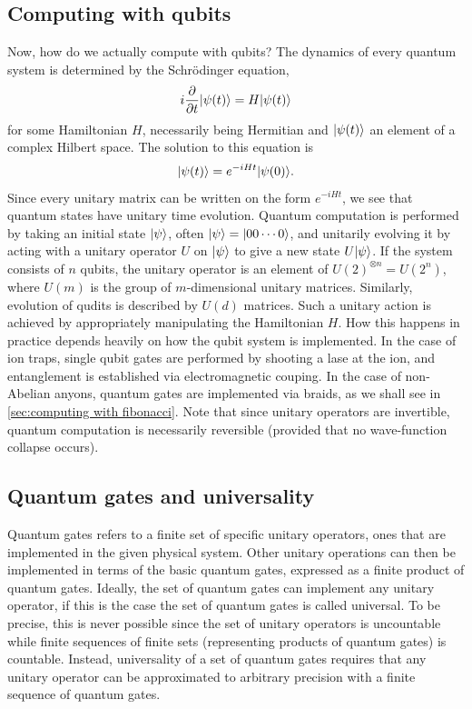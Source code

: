 \documentclass[a4paper,10pt,oneside]{book}
\theoremstyle{plain}
\theoremstyle{definition}
\theoremstyle{remark}
\DeclarePairedDelimiter\ket{\lvert}{\rangle}
\begin{document}
\subsection{Computing with qubits} Now, how do we actually compute with qubits? The dynamics of every quantum system is determined by the Schrödinger equation,
\begin{equation}
  i\frac{\partial}{\partial t}\ket{\psi(t)} = H\ket{\psi(t)}
\end{equation}
for some Hamiltonian $H$, necessarily being Hermitian and $\ket{\psi(t)}$ an element of a complex Hilbert space. The solution to this equation is
\begin{equation}
  \ket{\psi(t)} = e^{-iHt}\ket{\psi(0)}.
\end{equation}
Since every unitary matrix can be written on the form $e^{-iHt}$, we see that quantum states have unitary time evolution. Quantum computation is performed by taking an initial state $\ket{\psi}$, often $\ket{\psi} = \ket{00\cdots0}$, and unitarily evolving it by acting with a unitary operator $U$ on $\ket{\psi}$ to give a new state $U\ket{\psi}$. If the system consists of $n$ qubits, the unitary operator is an element of $U(2)^{\otimes n} = U(2^n)$, where $U(m)$ is the group of $m$-dimensional unitary matrices. Similarly, evolution of qudits is described by $U(d)$ matrices. Such a unitary action is achieved by appropriately manipulating the Hamiltonian $H$. How this happens in practice depends heavily on how the qubit system is implemented. In the case of ion traps, single qubit gates are performed by shooting a lase at the ion, and entanglement is established via electromagnetic couping. In the case of non-Abelian anyons, quantum gates are implemented via braids, as we shall see in \cref{sec:computing with fibonacci}. Note that since unitary operators are invertible, quantum computation is necessarily reversible (provided that no wave-function collapse occurs).

\subsection{Quantum gates and universality}\label{sec:gates and universality}

Quantum gates refers to a finite set of specific unitary operators, ones that are implemented in the given physical system. Other unitary operations can then be implemented in terms of the basic quantum gates, expressed as a finite product of quantum gates. Ideally, the set of quantum gates can implement any unitary operator, if this is the case the set of quantum gates is called universal. To be precise, this is never possible since the set of unitary operators is uncountable while finite sequences of finite sets (representing products of quantum gates) is countable. Instead, universality of a set of quantum gates requires that any unitary operator can be approximated to arbitrary precision with a finite sequence of quantum gates.
\end{document}
